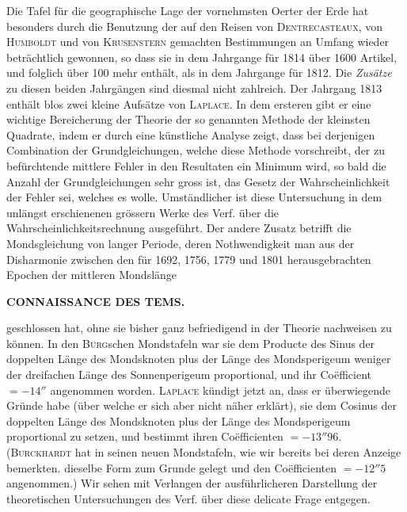 Die Tafel für die geographische Lage der vornehmsten Oerter der Erde hat besonders durch die Benutzung der auf den Reisen von \textsc{Dentrecasteaux}, von \textsc{Humboldt} und von \textsc{Krusenstern} gemachten Bestimmungen an Umfang wieder beträchtlich gewonnen, so dass sie in dem Jahrgange für 1814 über 1600 Artikel, und folglich über 100 mehr enthält, als in dem Jahrgange für 1812. Die \emph{Zusätze} zu diesen beiden Jahrgängen sind diesmal nicht zahlreich. Der Jahrgang 1813 enthält blos zwei kleine Aufsätze von \textsc{Laplace}. In dem ersteren gibt er eine wichtige Bereicherung der Theorie der so genannten Methode der kleinsten Quadrate, indem er durch eine künstliche Analyse zeigt, dass bei derjenigen Combination der Grundgleichungen, welche diese Methode vorschreibt, der zu befürchtende mittlere Fehler in den Resultaten ein Minimum wird, so bald die Anzahl der Grundgleichungen sehr gross ist, das Gesetz der Wahrscheinlichkeit der Fehler sei, welches es wolle. Umständlicher ist diese Untersuchung in dem unlängst erschienenen grössern Werke des Verf. über die Wahrscheinlichkeitsrechnung ausgeführt. Der andere Zusatz betrifft die Mondsgleichung von langer Periode, deren Nothwendigkeit man aus der Disharmonie zwischen den für 1692, 1756, 1779 und 1801 herausgebrachten Epochen der mittleren Mondslänge\par
\clearpage
\thispagestyle{empty}
\noindent{}%
\makebox[12mm][l]{}%
\parbox[t]{\dimexpr\linewidth-24mm\relax}{\centering\footnotesize\bfseries CONNAISSANCE DES TEMS.\par}%
\par\medskip
\noindent geschlossen hat, ohne sie bisher ganz befriedigend in der Theorie nachweisen zu können. In den \textsc{Bürg}schen Mondstafeln war sie dem Producte des Sinus der doppelten Länge des Mondsknoten plus der Länge des Mondsperigeum weniger der dreifachen Länge des Sonnenperigeum proportional, und ihr Coëfficient $= -14''$ angenommen worden. \textsc{Laplace} kündigt jetzt an, dass er überwiegende Gründe habe (über welche er sich aber nicht näher erklärt), sie dem Cosinus der doppelten Länge des Mondsknoten plus der Länge des Mondsperigeum proportional zu setzen, und bestimmt ihren Coëfficienten $= -13''96$. (\textsc{Burckhardt} hat in seinen neuen Mondstafeln, wie wir bereits bei deren Anzeige bemerkten. dieselbe Form zum Grunde gelegt und den Coëfficienten $= -12''5$ angenommen.) Wir sehen mit Verlangen der ausführlicheren Darstellung der theoretischen Untersuchungen des Verf. über diese delicate Frage entgegen.

